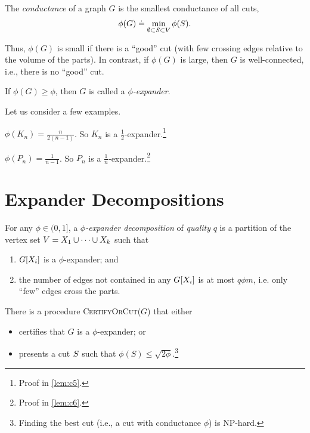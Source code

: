 \begin{defn}The \emph{conductance} of a graph $G$ is the smallest conductance of all cuts, \begin{align}
    \phi(G) \overset{.}{=} \min_{\emptyset \subset S \subset V} \phi(S).
\end{align}
\end{defn} Thus, $\phi(G)$ is small if there is a ``good'' cut (with few crossing edges relative to the volume of the parts). In contrast, if $\phi(G)$ is large, then $G$ is well-connected, i.e., there is no ``good'' cut.

\begin{defn}[Expander] If $\phi(G) \geq \phi$, then $G$ is called a \emph{$\phi$-expander}.
\end{defn}

Let us consider a few examples.

\begin{lem}
$\phi(K_n) = \frac{n}{2(n-1)}$. So $K_n$ is a $\frac{1}{2}$-expander.\footnote{Proof in \cref{lem:c5}.}
\end{lem}

\begin{lem}
$\phi(P_n) = \frac{1}{n-1}$. So $P_n$ is a $\frac{1}{n}$-expander.\footnote{Proof in \cref{lem:c6}.}
\end{lem}

\section{Expander Decompositions}

\begin{defn} For any $\phi \in (0,1]$, a \emph{$\phi$-expander decomposition} of \emph{quality} $q$ is a partition of the vertex set $V = X_1 \cup \dots \cup X_k$ such that \begin{enumerate}
    \item $G[X_i]$ is a $\phi$-expander; and
    \item the number of edges not contained in any $G[X_i]$ is at most $q \phi m$, i.e. only ``few'' edges cross the parts.
\end{enumerate}
\end{defn}

\begin{thm}
There is a procedure \textsc{CertifyOrCut($G$)} that either \begin{itemize}
    \item certifies that $G$ is a $\phi$-expander; or
    \item presents a cut $S$ such that $\phi(S) \leq \sqrt{2\phi}$.\footnote{Finding the best cut (i.e., a cut with conductance $\phi$) is NP-hard.}
\end{itemize}
\end{thm}

